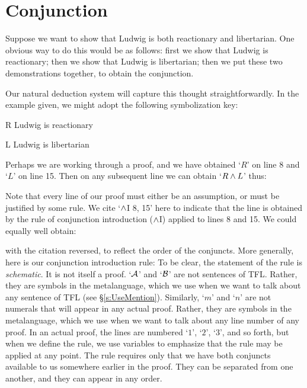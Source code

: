 \section{Conjunction}
Suppose we want to show that Ludwig is both reactionary and libertarian. One obvious way to do this would be as follows: first we show that Ludwig is reactionary; then we show that Ludwig is libertarian; then we put these two demonstrations together, to obtain the conjunction.

Our natural deduction system will capture this thought straightforwardly. In the example given, we might adopt the following symbolization key:
	\begin{ekey}
		\item[R] Ludwig is reactionary
		\item[L] Ludwig is libertarian
	\end{ekey}
Perhaps we are working through a proof, and we have obtained `$R$' on line 8 and `$L$' on line 15. Then on any subsequent line we can obtain `$R \wedge L$' thus:
\begin{fitchproof}
	 
\end{fitchproof}
Note that every line of our proof must either be an assumption, or must be justified by some rule. We cite `$\wedge$I 8, 15' here to indicate that the line is obtained by the rule of conjunction introduction ($\wedge$I) applied to lines 8 and 15. We could equally well obtain:
\begin{fitchproof}
	 
\end{fitchproof}
with the citation reversed, to reflect the order of the conjuncts. More generally, here is our conjunction introduction rule:
To be clear, the statement of the rule is \emph{schematic}. It is not itself a proof.  `$\mathcal{A}$' and `$\mathcal{B}$' are not sentences of TFL. Rather, they are symbols in the metalanguage, which we use when we want to talk about any sentence of TFL (see \S\ref{s:UseMention}). Similarly, `$m$' and `$n$' are not numerals that will appear in any actual proof. Rather, they are symbols in the metalanguage, which we use when we want to talk about any line number of any proof. In an actual proof, the lines are numbered `$1$', `$2$', `$3$', and so forth, but when we define the rule, we use variables to emphasize that the rule may be applied at any point. The rule requires only that we have both conjuncts available to us somewhere earlier in the proof. They can be separated from one another, and they can appear in any order.

